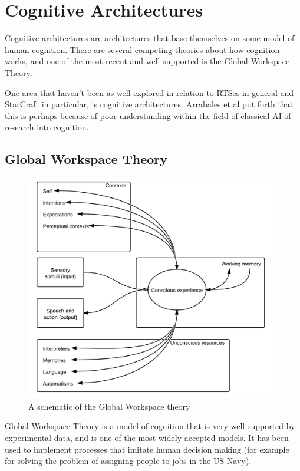 \section{Cognitive Architectures}
\label{sec:cogarch}
Cognitive architectures are architectures that base themselves on some model of human cognition. There are several competing theories about how cognition works, and one of the most recent and well-supported is the Global Workspace Theory.

One area that haven't been as well explored in relation to RTSes in general and StarCraft in particular, is cognitive architectures. Arrabales et al put forth that this is perhaps because of poor understanding within the field of classical AI of research into cognition\cite{arrabales2009gamechars}.

\subsection{Global Workspace Theory}

\begin{figure}[h!tb]
\centering
\includegraphics[scale=1.0]{graphics/globalworkspace.png}
\caption{A schematic of the Global Workspace theory\cite{baars2005gwt}}
\label{fig:gwt}
\end{figure}

Global Workspace Theory is a model of cognition that is very well supported by experimental data, and is one of the most widely accepted models. \cite{dehaene2001towards} It has been used to implement processes that imitate human decision making (for example for solving the problem of assigning people to jobs in the US Navy).\cite{baars2005gwt}\cite{franklin2003interacting}

